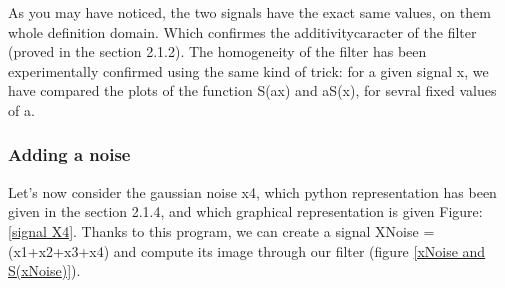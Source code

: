 \documentclass[a4paper,10pt]{article}
\begin{document}
	As you may have noticed, the two signals have the exact same values, on them whole definition domain.  Which confirmes the additivitycaracter of the filter (proved in the section 2.1.2).\newline
	The homogeneity of the filter has been experimentally confirmed using the same kind of trick: for a given signal x, we have compared the plots of the function  S(ax) and aS(x), for sevral fixed values of a.\newline

	
	
	\subsubsection{Adding a noise}
	Let's now consider the gaussian noise x4, which python representation has been given in the section 2.1.4, and which graphical representation is given Figure: \ref{signal X4}.  
	Thanks to this program, we can create a signal XNoise = (x1+x2+x3+x4) and compute its image through our filter (figure \ref{xNoise and S(xNoise)}).\newline
\end{document}
